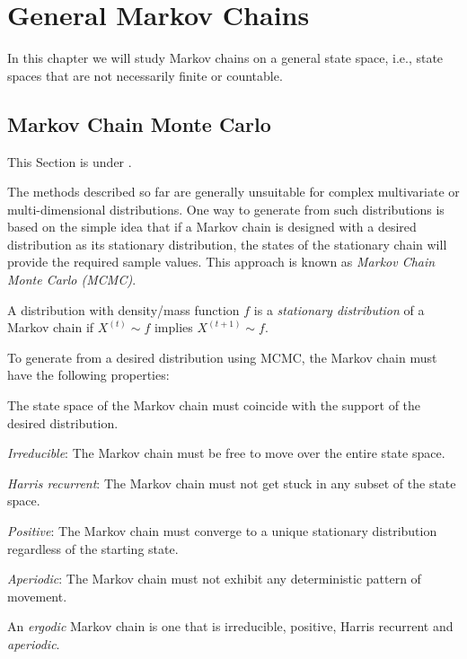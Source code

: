 \chapter{General Markov Chains}
In this chapter we will study Markov chains on a general state space, i.e., state spaces that are not necessarily finite or countable.

\section{Markov Chain Monte Carlo}

This Section is under \work.

The methods described so far are generally unsuitable for complex multivariate or multi-dimensional distributions. One way to generate from such distributions is based on the simple idea that if a Markov chain is designed with a desired distribution as its stationary distribution, the states of the stationary chain will provide the required sample values. This approach is known as {\it Markov Chain Monte Carlo (MCMC)}.


A distribution with density/mass function $f$ is a {\it stationary distribution} of a Markov chain if $X^{(t)}\sim f$ implies $X^{(t+1)}\sim f$.  

To generate from a desired distribution using MCMC, the Markov chain must have the following properties:

\begin{asparaenum}[(a)]
\item The state space of the Markov chain must coincide with the support of the desired distribution.

\item {\it Irreducible}: The Markov chain must be free to move over the entire state space.

\item {\it Harris recurrent}: The Markov chain must not get stuck in any subset of the state space.

\item {\it Positive}: The Markov chain must converge to a unique stationary distribution regardless of the starting state.

\item {\it Aperiodic}: The Markov chain must not exhibit any deterministic pattern of movement.
\end{asparaenum}

\begin{definition}
An {\it ergodic} Markov chain is one that is irreducible, positive, Harris recurrent and {\it aperiodic}.
\end{definition}

